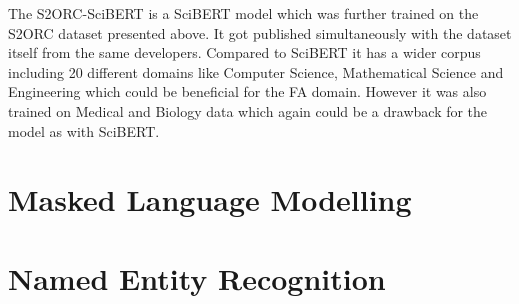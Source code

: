 The S2ORC-SciBERT is a SciBERT model which was further trained on the S2ORC dataset presented above. It got published simultaneously with the dataset itself from the same developers. Compared to SciBERT it has a wider corpus including 20 different domains like Computer Science, Mathematical Science and Engineering which could be beneficial for the FA domain. However it was also trained on Medical and Biology data which again could be a drawback for the model as with SciBERT.


\section{Masked Language Modelling}
\section{Named Entity Recognition}